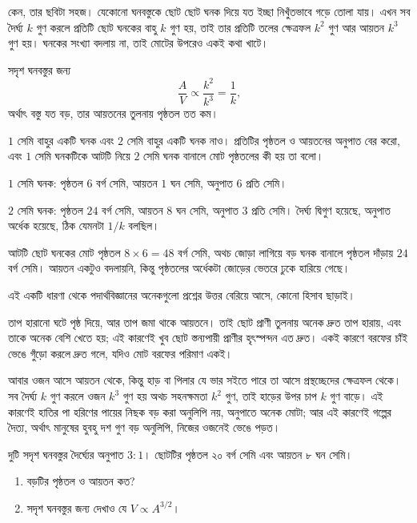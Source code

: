 \documentclass[11pt]{article}
\begin{document}
কেন, তার ছবিটা সহজ। যেকোনো ঘনবস্তুকে ছোট ছোট ঘনক দিয়ে যত ইচ্ছা নিখুঁতভাবে গড়ে
তোলা যায়। এখন সব দৈর্ঘ্য $k$ গুণ করলে প্রতিটি ছোট ঘনকের বাহু $k$ গুণ হয়, তাই
তার প্রতিটি তলের ক্ষেত্রফল $k^{2}$ গুণ আর আয়তন $k^{3}$ গুণ হয়। ঘনকের সংখ্যা
বদলায় না, তাই মোটের উপরেও একই কথা খাটে।

\begin{idea}[পৃষ্ঠতল ও আয়তনের অনুপাত]
সদৃশ ঘনবস্তুর জন্য
\[
  \frac{A}{V} \propto \frac{k^{2}}{k^{3}} = \frac{1}{k} ,
\]
অর্থাৎ বস্তু যত বড়, তার আয়তনের তুলনায় পৃষ্ঠতল তত কম।
\end{idea}

\begin{example}
$1$ সেমি বাহুর একটি ঘনক এবং $2$ সেমি বাহুর একটি ঘনক নাও। প্রতিটির পৃষ্ঠতল ও
আয়তনের অনুপাত বের করো, এবং $1$ সেমি ঘনকটিকে আটটি নিয়ে $2$ সেমি ঘনক বানালে মোট
পৃষ্ঠতলের কী হয় তা বলো।
\end{example}

\begin{solbox}
$1$ সেমি ঘনক: পৃষ্ঠতল $6$ বর্গ সেমি, আয়তন $1$ ঘন সেমি, অনুপাত $6$ প্রতি সেমি।

$2$ সেমি ঘনক: পৃষ্ঠতল $24$ বর্গ সেমি, আয়তন $8$ ঘন সেমি, অনুপাত $3$ প্রতি সেমি।
দৈর্ঘ্য দ্বিগুণ হয়েছে, অনুপাত অর্ধেক হয়েছে, ঠিক যেমনটা $1/k$ বলছিল।

আটটি ছোট ঘনকের মোট পৃষ্ঠতল $8 \times 6 = 48$ বর্গ সেমি, অথচ জোড়া লাগিয়ে বড় ঘনক
বানালে পৃষ্ঠতল দাঁড়ায় $24$ বর্গ সেমি। আয়তন একটুও বদলায়নি, কিন্তু পৃষ্ঠতলের
অর্ধেকটা জোড়ের ভেতরে ঢুকে হারিয়ে গেছে।
\end{solbox}

\begin{remark}
এই একটি ধারণা থেকে পদার্থবিজ্ঞানের অনেকগুলো প্রশ্নের উত্তর বেরিয়ে আসে, কোনো
হিসাব ছাড়াই।

তাপ হারানো ঘটে পৃষ্ঠ দিয়ে, আর তাপ জমা থাকে আয়তনে। তাই ছোট প্রাণী তুলনায় অনেক
দ্রুত তাপ হারায়, এবং তাকে অনেক বেশি খেতে হয়; এই কারণেই খুব ছোট স্তন্যপায়ী
প্রাণীর হৃৎস্পন্দন এত দ্রুত। একই কারণে বরফের চাঁই ভেঙে গুঁড়ো করলে দ্রুত গলে,
যদিও মোট বরফের পরিমাণ একই।

আবার ওজন আসে আয়তন থেকে, কিন্তু হাড় বা পিলার যে ভার সইতে পারে তা আসে
প্রস্থচ্ছেদের ক্ষেত্রফল থেকে। সব দৈর্ঘ্য $k$ গুণ করলে ওজন $k^{3}$ গুণ হয় অথচ
সহনক্ষমতা $k^{2}$ গুণ, তাই হাড়ের উপর চাপ $k$ গুণ বাড়ে। এই কারণেই হাতির পা
হরিণের পায়ের নিছক বড় করা অনুলিপি নয়, অনুপাতে অনেক মোটা; আর এই কারণেই গল্পের
দৈত্য, অর্থাৎ মানুষের হুবহু দশ গুণ বড় অনুলিপি, নিজের ওজনেই ভেঙে পড়ত।
\end{remark}

 দুটি সদৃশ ঘনবস্তুর দৈর্ঘ্যের অনুপাত $3 : 1$। ছোটটির পৃষ্ঠতল ২০ বর্গ
সেমি এবং আয়তন ৮ ঘন সেমি।
\begin{enumerate}
  \item বড়টির পৃষ্ঠতল ও আয়তন কত?
  \item সদৃশ ঘনবস্তুর জন্য দেখাও যে $V \propto A^{3/2}$।
\end{enumerate}
\end{document}
